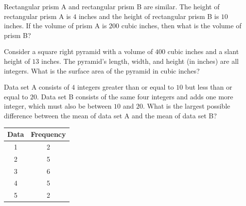 \noindent\markforreview
\vspace{1em}

\vspace{1em}

Rectangular prism A and rectangular prism B are similar. 
The height of rectangular prism A is $4$ inches and the height of rectangular prism B is $10$ inches. 
If the volume of prism A is $200$ cubic inches, then what is the volume of prism B?


\vspace{1.5em}

\vspace{2em}

\noindent\markforreview
\vspace{1em}

\vspace{1em}

Consider a square right pyramid with a volume of $400$ cubic inches and a slant height of $13$ inches. 
The pyramid's length, width, and height (in inches) are all integers. 
What is the surface area of the pyramid in cubic inches?

\newpage

\newpage

\noindent\markforreview
\vspace{1em}

\vspace{1em}

Data set A consists of $4$ integers greater than or equal to $10$ but less than or equal to $20$. 
Data set B consists of the same four integers and adds one more integer, which must also be between $10$ and $20$. 
What is the largest possible difference between the mean of data set A and the mean of data set B?


\vspace{4em}

\vspace{2em}

\noindent\markforreview
\vspace{1em}

\vspace{1em}

\begin{center}
\begin{tabular}{|c|c|}
\hline
\textbf{Data} & \textbf{Frequency}\\
\hline
1 & 2\\
2 & 5\\
3 & 6\\
4 & 5\\
5 & 2\\
\hline
\end{tabular}
\end{center}

